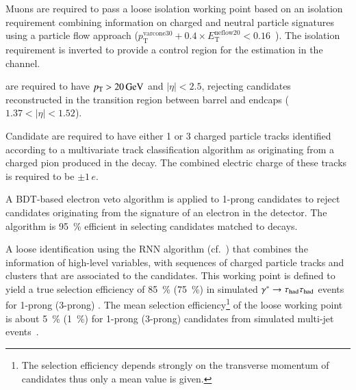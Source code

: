 \begin{description}
  Muons are required to pass a loose isolation working point based on
  an isolation requirement combining information on charged and
  neutral particle signatures using a particle flow approach
  ($p_{\text{T}}^{\text{varcone30}} + 0.4 \times
  E_{\text{T}}^{\text{neflow20}} < 0.16$~\cite{MUON-2018-03}). The
  isolation requirement is inverted to provide a control region for
  the \faketauhadvis estimation in the \lephad channel.




\item[\tauhadvis] are required to have $\pT > \SI{20}{\GeV}$ and
  $|\eta| < 2.5$, rejecting candidates reconstructed in the transition
  region between barrel and endcaps ($1.37 < |\eta| < 1.52$).

  Candidate \tauhadvis are required to have either 1 or 3 charged
  particle tracks identified according to a multivariate track
  classification algorithm as originating from a charged pion produced
  in the \taulepton decay. The combined electric charge of these
  tracks is required to be $\pm 1\,e$.

  A BDT-based electron veto algorithm is applied to 1-prong \tauhadvis
  candidates to reject candidates originating from the signature of an
  electron in the detector. The algorithm is \SI{95}{\percent}
  efficient in selecting \tauhadvis candidates matched to \tauhad
  decays.

  A loose \tauhadvis identification using the RNN algorithm
  (cf.~) that combines the information of high-level
  variables, with sequences of charged particle tracks and clusters
  that are associated to the \tauhadvis candidates. This working point
  is defined to yield a true \tauhadvis selection efficiency of
  \SI{85}{\percent} (\SI{75}{\percent}) in simulated
  $\gamma^* \to \tau_{\text{had}}\tau_{\text{had}}$ events for 1-prong (3-prong)
  \tauhadvis. The mean \faketauhadvis selection
  efficiency\footnote{The \faketauhadvis selection efficiency depends
    strongly on the transverse momentum of \tauhadvis candidates thus
    only a mean value is given.} of the loose working point is about
  \SI{5}{\percent} (\SI{1}{\percent}) for 1-prong (3-prong) \tauhadvis
  candidates from simulated multi-jet
  events~\cite{ATL-PHYS-PUB-2019-033}.


\end{description}
